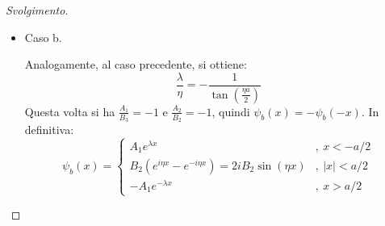 \documentclass[10pt, a4paper]{scrartcl} %
\numberwithin{equation}{subsection}
\theoremstyle{style2}
\theoremstyle{style1}
\renewcommand\qedsymbol{$\blacksquare$}
\newenvironment{svolgimento}{\renewcommand\qedsymbol{$\spadesuit$}\begin{proof}[Svolgimento]}{\end{proof}}
\begin{document}
\begin{svolgimento}
\begin{itemize}
	La condizione si riscrive come:
	\begin{equation}\label{sca}
	\begin{split}
		&\frac{\lambda  / \eta - i}{\lambda  / \eta + i} = - e^{i\eta a}  \implies \frac{\lambda}{\eta} (1+e^{i\eta} ) = i (1- e^{i\eta a} ) \\
		& \Rightarrow \frac{\lambda}{\eta} = \tan \left(\frac{\eta a}{2}\right) 
	\end{split}
	\end{equation}
	In questo caso, i coefficienti verificano
	\[
		\frac{A_1}{B_3}= -e^{i\eta a} \frac{\lambda  + i \eta}{\lambda  - i \eta} = 1 \hspace{.1cm} ; \hspace{.2cm} \frac{A_2}{B_2}= e^{i\eta a} \frac{\lambda +i\eta }{2i\eta }= 1
	\] 
cio\`e le autofunzioni sono simmetriche rispetto allo zero, quindi sono pari: $\psi_a (x) = \psi_a (-x)$. In definitiva:
\begin{equation}\label{spp}
	\psi _a(x) = \begin{cases}
		A_1 e^{\lambda x} &,\  x < - a/2\\
		B_2 (e^{i\eta x} + e^{-i\eta x} ) = 2B_2 \cos(\eta x) & ,\ \lvert x \rvert < a / 2\\
		A_1 e^{-\lambda x} &,\ x > a / 2
	\end{cases}
\end{equation}
\item Caso b.

	Analogamente, al caso precedente, si ottiene:
	\begin{equation}\label{scb}
	\frac{\lambda }{\eta} = -\frac{1}{\tan\left(\frac{\eta a}{2}\right) }
	\end{equation}
	Questa volta si ha $\frac{A_1}{B_3} = - 1$ e $\frac{A_2}{B_2} = -1$, quindi $\psi _b(x) = - \psi _b(-x)$. In definitiva:
	\begin{equation}\label{spn}
	\psi _b(x) = \begin{cases}
		A_1 e^{\lambda x} &,\  x < - a/2\\
		B_2 (e^{i\eta x} - e^{-i\eta x} ) = 2iB_2 \sin(\eta x) & ,\ \lvert x \rvert < a / 2\\
		-A_1 e^{-\lambda x} &,\ x > a / 2
	\end{cases}
\end{equation}
\end{itemize}
\end{svolgimento}
\end{document}
